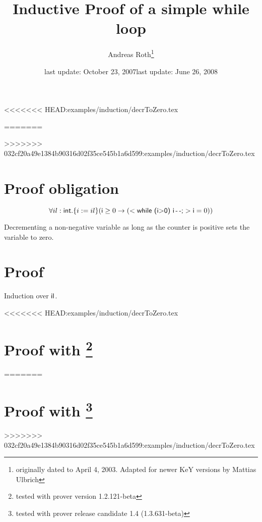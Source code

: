 \documentclass[11pt]{article}
\newcommand{\java}[1]{\mbox{\textsf{#1}}}
\begin{document}
\title{Inductive Proof of a simple while loop}
\author{Andreas Roth\footnote{originally dated to April 4, 2003. Adapted for newer KeY versions by Mattias Ulbrich}}
<<<<<<< HEAD:examples/induction/decrToZero.tex
\date{last update: October 23, 2007}
=======
\date{last update: June 26, 2008}
>>>>>>> 032cf20a49e1384b90316d02f35ce545b1a6d599:examples/induction/decrToZero.tex
\maketitle

\section*{Proof obligation}
\[ \forall il:\java{int}. \{i:=il\}(\java{i}\geq 0 \rightarrow ( <\java{while (i$>$0) i\,-\,-;}> \java{i}=0))\]

\noindent Decrementing a non-negative variable as long as the counter is
positive sets the variable to zero.

\section*{Proof}

Induction over $\java{il}$.

<<<<<<< HEAD:examples/induction/decrToZero.tex
\section*{Proof with \KeY\footnote{tested with prover version 1.2.121-beta}}
=======
\section*{Proof with \KeY\footnote{tested with prover release candidate 1.4 (1.3.631-beta)}}
>>>>>>> 032cf20a49e1384b90316d02f35ce545b1a6d599:examples/induction/decrToZero.tex
\end{document}
